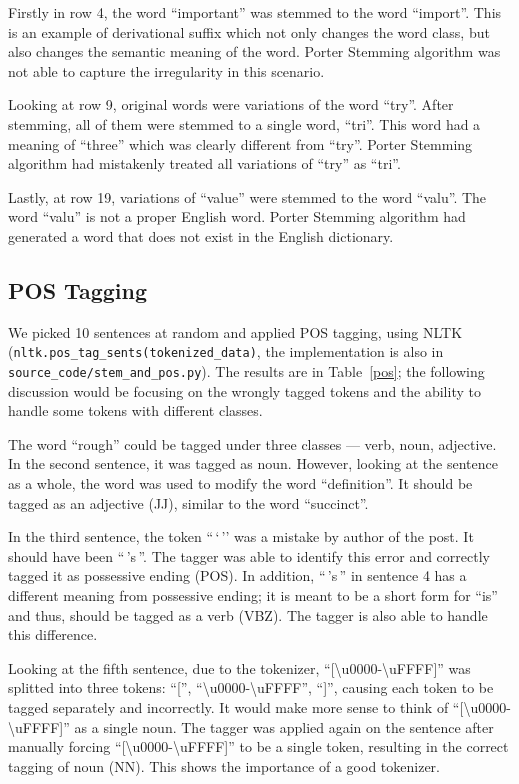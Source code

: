 Firstly in row 4, the word ``important'' was stemmed to the word ``import''.
This is an example of derivational suffix which not only changes the word class,
but also changes the semantic meaning of the word. Porter Stemming algorithm was
not able to capture the irregularity in this scenario. 

Looking at row 9, original words were variations of the word ``try''. After
stemming, all of them were stemmed to a single word, ``tri''. This word had a
meaning of ``three'' which was clearly different from ``try''. Porter Stemming
algorithm had mistakenly treated all variations of ``try'' as ``tri''.

Lastly, at row 19, variations of ``value'' were stemmed to the word ``valu''.
The word ``valu'' is not a proper English word. Porter Stemming algorithm had
generated a word that does not exist in the English dictionary.

\subsection{POS Tagging}

We picked 10 sentences at random and applied POS tagging, using NLTK 
(\texttt{nltk.pos\_tag\_sents(tokenized\_data)}, the implementation is
also in \texttt{source\_code/stem\_and\_pos.py}).
The results are in Table~\ref{pos}; the following discussion would be
focusing on the wrongly tagged tokens and the ability to handle some
tokens with different classes.

The word ``rough'' could be tagged under three classes --- verb, noun,
adjective. In the second sentence, it was tagged as noun. However, looking at
the sentence as a whole, the word was used to modify the word ``definition''.
It should be tagged as an adjective (JJ), similar to the word ``succinct''.

In the third sentence, the token ``\,`\,'' was a mistake by author of the post. It
should have been ``\,'s\,''. The tagger was able to identify this error and
correctly tagged it as possessive ending (POS). In addition, ``\,'s\,'' in sentence
4 has a different meaning from possessive ending; it is meant to be a short
form for ``is'' and thus, should be tagged as a verb (VBZ). The tagger is also
able to handle this difference.

Looking at the fifth sentence, due to the tokenizer,
``{[}\textbackslash{}u0000-\textbackslash{}uFFFF{]}'' was splitted into
three tokens: ``['',
``\textbackslash{}u0000-\textbackslash{}uFFFF'', ``]'', causing each token to
be tagged separately and incorrectly. It would make more sense to think of
``{[}\textbackslash{}u0000-\textbackslash{}uFFFF{]}'' as a single noun.
The tagger was applied again on the sentence after manually forcing
``{[}\textbackslash{}u0000-\textbackslash{}uFFFF{]}'' to be a single token,
resulting in the correct tagging of noun (NN). This shows the importance of a
good tokenizer.

